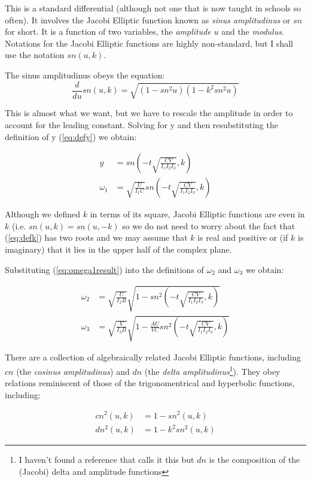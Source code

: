 \documentclass[a4paper, 12pt]{article}
\begin{document}
This is a standard differential (although not one that is now taught in schools so often). It involves the Jacobi Elliptic function known as {\it sinus amplitudinus} or $sn$ for short. It is a function of two variables, the {\it amplitude} $u$ and the {\it modulus}. Notations for the Jacobi Elliptic functions are highly non-standard, but I shall use the notation $sn(u, k)$.

The sinus amplitudinus obeys the equation:
\begin{equation}
  \frac{d}{du}sn(u, k)=\sqrt{(1 - sn^2u)(1 - k^2 sn^2 u)}
\end{equation}

This is almost what we want, but we have to rescale the amplitude in order to account for the leading constant. Solving for y and then resubstituting the definition of y (\ref{eq:defy}) we obtain:

\begin{align}
  y &= sn(-t\sqrt{\frac{CV}{I_1I_2I_3}}, k) \\
  \omega_1 &= \sqrt{\frac{U}{I_1C}}sn(-t\sqrt{\frac{CV}{I_1I_2I_3}}, k) \label{eq:omega1result}
\end{align}

Although we defined $k$ in terms of its square, Jacobi Elliptic functions are even in $k$ (i.e. $sn(u, k) = sn(u, -k)$ so we do not need to worry about the fact that (\ref{eq:defk}) has two roots and we may assume that $k$ is real and positive or (if $k$ is imaginary) that it lies in the upper half of the complex plane.



Substituting (\ref{eq:omega1result}) into the definitions of $\omega_2$ and $\omega_3$ we obtain:

\begin{align}
  \omega_2 &=\sqrt{\frac{U}{I_2B}}\sqrt{1 - sn^2(-t\sqrt{\frac{CV}{I_1I_2I_3}}, k)} \\
  \omega_3 &=\sqrt{\frac{V}{I_3B}}\sqrt{1 - \frac{AU}{VC}sn^2(-t\sqrt{\frac{CV}{I_1I_2I_3}}, k)}
\end{align}

There are a collection of algebraically related Jacobi Elliptic functions, including $cn$ (the {\it cosinus amplitudinus}) and $dn$ (the {\it delta amplitudinus}\footnote{I haven't found a reference that calls it this but $dn$ is the composition of the (Jacobi) delta and amplitude functions}). They obey relations reminiscent of those of the trigonomentrical and hyperbolic functions, including:

\begin{align}
  cn^2(u, k) &= 1 - sn^2(u, k) \\
  dn^2(u, k) &= 1 - k^2sn^2(u, k)
\end{align}
\end{document}
